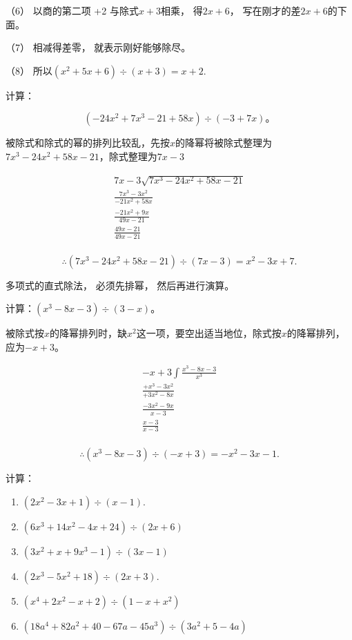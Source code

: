（6） 以商的第二项 +2 与除式\(x + 3\)相乘， 得\(2x + 6\)，
写在刚才的差\(2x + 6\)的下面。

（7） 相减得差零， 就表示刚好能够除尽。

（8） 所以\((x^{2}+5x+6)\div(x+3)=x+2.\)

 计算：

\[
(- 24 x ^{2} + 7 x ^{3} - 21 + 58 x) \div (- 3 + 7 x)\text{。}
\]

被除式和除式的幂的排列比较乱，先按\(x\)的降幂将被除式整理为\(7x^{3} - 24x^{2} + 58x - 21\)，除式整理为\(7x - 3\)


\[
\begin{array}{l} 7 x - 3 \sqrt {7 x ^{3} - 24 x ^{2} + 58 x - 21} \\ \frac{7 x ^{3} - 3 x ^{2}}{- 21 x ^{2} + 58 x} \\ \frac{- 21 x ^{2} + 9 x}{49 x - 21} \\ \frac{49 x - 21}{49 x - 21} \\ \end{array}
\]

\[
\therefore (7 x ^{3} - 24 x ^{2} + 58 x - 21) \div (7 x - 3) = x ^{2} - 3 x + 7.
\]

 多项式的直式除法， 必须先排幂， 然后再进行演算。

 计算：\((x^{3}-8x-3)\div(3-x)\)。

被除式按\(x\)的降幂排列时，缺\(x^{2}\)这一项，要空出适当地位，除式按\(x\)的降幂排列，应为\(-x + 3\)。


\[
\begin{array}{l} - x + 3 \int \frac{x ^{3} - 8 x - 3}{x ^{3}} \\ \frac{+ x ^{3} - 3 x ^{2}}{+ 3 x ^{2} - 8 x} \\ \frac{- 3 x ^{2} - 9 x}{x - 3} \\ \frac{x - 3}{x - 3} \\ \end{array}
\]

\[
\therefore (x ^{3} - 8 x - 3) \div (- x + 3) = - x ^{2} - 3 x - 1.
\]

计算：

\begin{enumerate}[start=1]
\item
  \((2x^{2} - 3x + 1)\div (x - 1).\)
\item
  \((6x^{3} + 14x^{2} - 4x + 24)\div (2x + 6)\)
\item
  \((3x^{2} + x + 9x^{3} - 1)\div (3x - 1)\)
\item
  \((2x^{3} - 5x^{2} + 18)\div (2x + 3).\)
\item
  \((x^{4} + 2x^{2} - x + 2)\div (1 - x + x^{2})\)
\item
  \((18a^{4} + 82a^{2} + 40 - 67a - 45a^{3})\div (3a^{2} + 5 - 4a)\)
\end{enumerate}

